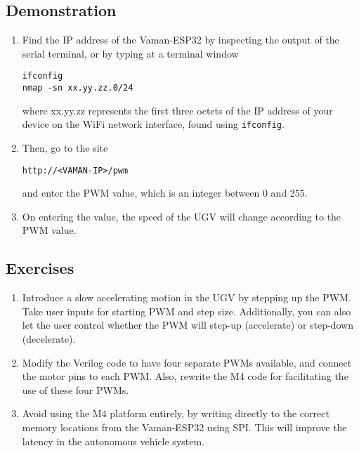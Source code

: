 \subsection{Demonstration}
\begin{enumerate}[resume]
    \item Find the IP address of the Vaman-ESP32 by inspecting the output of the
    serial terminal, or by typing at a terminal window
    \begin{lstlisting}
ifconfig
nmap -sn xx.yy.zz.0/24
    \end{lstlisting}
    where xx.yy.zz represents the first three octets of the IP address of your
    device on the WiFi network interface, found using \texttt{ifconfig}.
    \item Then, go to the site 
    \begin{lstlisting}
http://<VAMAN-IP>/pwm 
    \end{lstlisting}
    and enter the PWM value, which is an integer between 0 and 255.
    \item On entering the value, the speed of the UGV will change according to
    the PWM value.
\end{enumerate}

\subsection{Exercises}
\begin{enumerate}[resume]
    \item Introduce a slow accelerating motion in the UGV by stepping up the
    PWM. Take user inputs for starting PWM and step size. Additionally, you can
    also let the user control whether the PWM will step-up (accelerate) or
    step-down (decelerate).
    \item Modify the Verilog code to have four separate PWMs available, and
    connect the motor pins to each PWM. Also, rewrite the M4 code for
    facilitating the use of these four PWMs.
    \item Avoid using the M4 platform entirely, by writing directly to the
    correct memory locations from the Vaman-ESP32 using SPI. This will improve
    the latency in the autonomous vehicle system.
\end{enumerate}